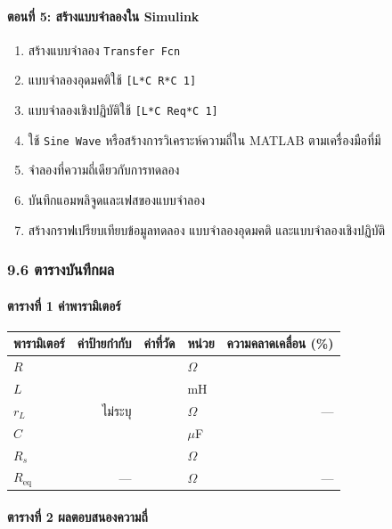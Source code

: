 \paragraph{ตอนที่ 5: สร้างแบบจำลองใน Simulink}

\begin{enumerate}
    \item สร้างแบบจำลอง \texttt{Transfer Fcn}
    \item แบบจำลองอุดมคติใช้ \texttt{[L*C R*C 1]}
    \item แบบจำลองเชิงปฏิบัติใช้ \texttt{[L*C Req*C 1]}
    \item ใช้ \texttt{Sine Wave} หรือสร้างการวิเคราะห์ความถี่ใน MATLAB ตามเครื่องมือที่มี
    \item จำลองที่ความถี่เดียวกับการทดลอง
    \item บันทึกแอมพลิจูดและเฟสของแบบจำลอง
    \item สร้างกราฟเปรียบเทียบข้อมูลทดลอง แบบจำลองอุดมคติ และแบบจำลองเชิงปฏิบัติ
\end{enumerate}

\subsubsection{9.6 ตารางบันทึกผล}

\paragraph{ตารางที่ 1 ค่าพารามิเตอร์}

\begin{table}[htbp]
    \centering
    \begin{tabular}{l r r l r}
        \hline
        \textbf{พารามิเตอร์} & \textbf{ค่าป้ายกำกับ} & \textbf{ค่าที่วัด} & \textbf{หน่วย} & \textbf{ความคลาดเคลื่อน (\%)} \\
        \hline
        $R$ &  &  & $\Omega$ &  \\
        $L$ &  &  & mH &  \\
        $r_L$ & ไม่ระบุ &  & $\Omega$ & — \\
        $C$ &  &  & $\mu$F &  \\
        $R_s$ &  &  & $\Omega$ &  \\
        $R_{\text{eq}}$ & — &  & $\Omega$ & — \\
        \hline
    \end{tabular}
\end{table}

\paragraph{ตารางที่ 2 ผลตอบสนองความถี่}

